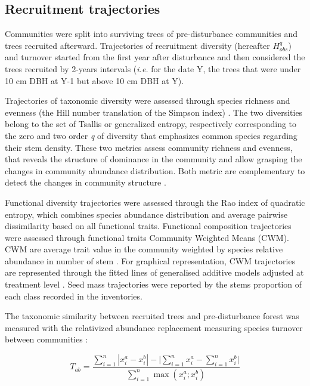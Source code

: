 \documentclass[fleqn,10pt]{ArtEcoFoG} %
\begin{document}
\hypertarget{recruitment-trajectories}{%
\subsection{Recruitment trajectories}\label{recruitment-trajectories}}

\color{red}

Communities were split into surviving trees of pre-disturbance communities and trees recruited afterward.
Trajectories of recruitment diversity (hereafter \(H^q_{obs}\)) and turnover started from the first year after disturbance and then considered the trees recruited by 2-years intervals (\emph{i.e.} for the date Y, the trees that were under 10 cm DBH at Y-1 but above 10 cm DBH at Y).
\color{black}

Trajectories of taxonomic diversity were assessed through species richness and evenness (the Hill number translation of the Simpson index) \citep{Chao2015, Marcon2015}.
The two diversities belong to the set of Tsallis or generalized entropy, respectively corresponding to the zero and two order \emph{q} of diversity that emphasizes common species
\color{red}
regarding their stem density.
These two metrics assess community richness and evenness, that reveals the structure of dominance in the community and allow grasping the changes in community abundance distribution.
Both metric are complementary to detect the changes in community structure \citep{Magurran2004}.
\color{black}

Functional diversity trajectories were assessed through the Rao index of quadratic entropy, which combines species abundance distribution and average pairwise dissimilarity based on all functional traits.
Functional composition trajectories were assessed through functional traits Community Weighted Means (CWM).
CWM are average trait value in the community weighted by species relative abundance in number of stem \citep{Diaz2007}.
For graphical representation, CWM trajectories are represented through the fitted lines of generalised additive models adjusted at treatment level \citep{Wood2011}.
Seed mass trajectories were reported by the stems proportion of each class recorded in the inventories.

\color{red}

The taxonomic similarity between recruited trees and pre-disturbance forest was measured with the relativized abundance replacement measuring species turnover between communities \citep{Podani2013a}:

\begin{equation}
T_{ab}=\frac{\sum_{i=1}^{n}|x_i^a - x_i^b| - \bigg| \sum_{i=1}^{n}{x_i^a} - \sum_{i=1}^{n}{x_i^b} \bigg|}{\sum_{i=1}^{n}\max{\left( x_i^a;x_i^b \right)}}
\label{eq:formNestedness}
\end{equation}
\end{document}

